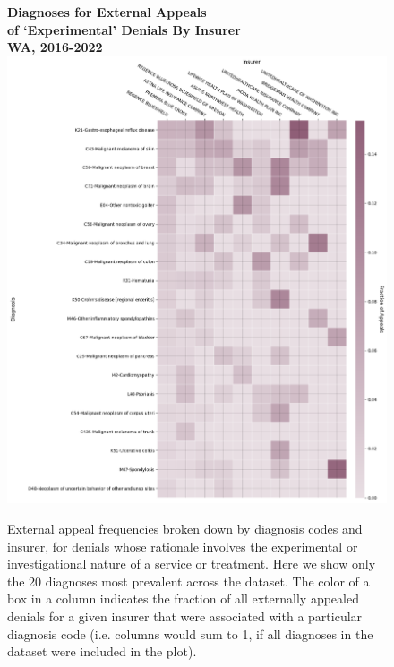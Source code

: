 \documentclass[12pt, a4paper,twoside,parskip=full]{report}
\theoremstyle{plain} %
\theoremstyle{definition} %
\theoremstyle{remark} %
\numberwithin{equation}{chapter}
\begin{document}
		\begin{figure}[h!]
			\centering
			\textbf{Diagnoses for External Appeals}\\
			\textbf{of `Experimental' Denials By Insurer}\\
			\textbf{WA, 2016-2022}\\
			\includegraphics[width=.8\textwidth]{images/wa_external_appeals/experimental_diagnosis_by_insurer.png}
			\caption{External appeal frequencies broken down by diagnosis codes and insurer, for denials whose rationale involves the experimental or investigational nature of a service or treatment. Here we show only the 20 diagnoses most prevalent across the dataset. The color of a box in a column indicates the fraction of all externally appealed denials for a given insurer that were associated with a particular diagnosis code (i.e. columns would sum to 1, if all diagnoses in the dataset were included in the plot).}
			\label{waexpexternalappealsbydiagnosisinsurer}
		\end{figure}
	\clearpage
		
\end{document}
